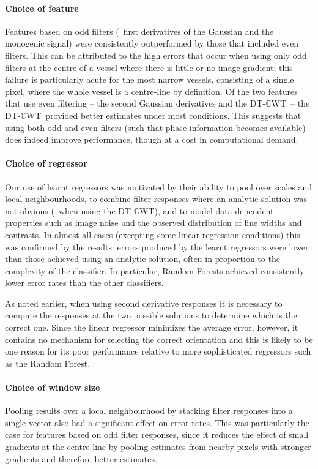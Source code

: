 \documentclass[10pt,twocolumn,letterpaper]{article}
\def\dtcwt{DT-$\mathbb{C}$WT}
\begin{document}
\paragraph{Choice of feature}
Features based on odd filters (\ie~first derivatives of the Gaussian and the monogenic signal) were consistently outperformed by those that included even filters. This can be attributed to the high errors that occur when using only odd filters at the centre of a vessel where there is little or no image gradient; this failure is particularly acute for the most narrow vessels, consisting of a single pixel, where the whole vessel is a centre-line by definition. Of the two features that use even filtering -- the second Gaussian derivatives and the \dtcwt~-- the \dtcwt~provided better estimates under most conditions. This suggests that using both odd and even filters (such that phase information becomes available) does indeed improve performance, though at a cost in computational demand.

\paragraph{Choice of regressor}
Our use of learnt regressors was motivated by their ability to pool over scales and local neighbourhoods, to combine filter responses where an analytic solution was not obvious (\eg~when using the \dtcwt), and to model data-dependent properties such as image noise and the observed distribution of line widths and contrasts. In almost all cases (excepting some linear regression conditions) this was confirmed by the results: errors produced by the learnt regressors were lower than those achieved using an analytic solution, often in proportion to the complexity of the classifier. In particular, Random Forests achieved consistently lower error rates than the other classifiers.

As noted earlier, when using second derivative responses it is necessary to compute the responses at the two possible solutions to determine which is the correct one. Since the linear regressor minimizes the average error, however, it contains no mechanism for selecting the correct orientation and this is likely to be one reason for its poor performance relative to more sophisticated regressors such as the Random Forest.

\paragraph{Choice of window size}
Pooling results over a local neighbourhood by stacking filter responses into a single vector also had a significant effect on error rates. This was particularly the case for features based on odd filter responses, since it reduces the effect of small gradients at the centre-line by pooling estimates from nearby pixels with stronger gradients and therefore better estimates.
\end{document}
